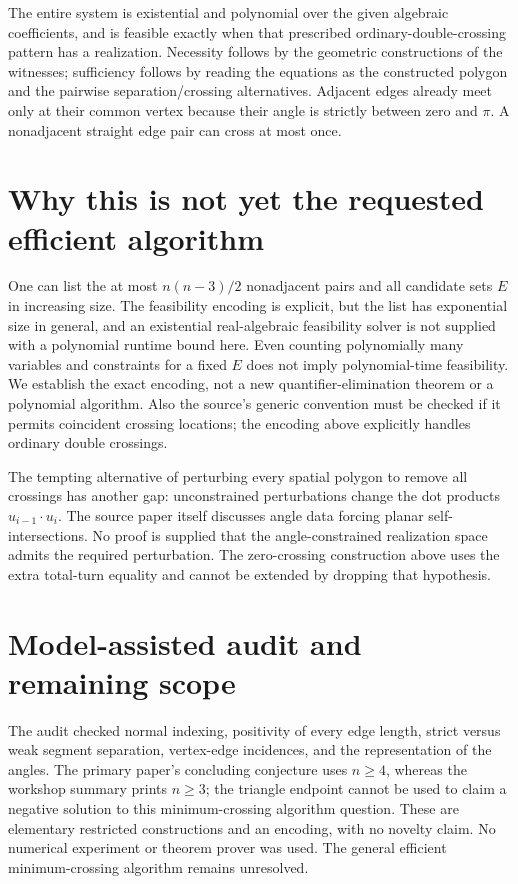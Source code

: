 \documentclass[11pt]{article}
\begin{document}
The entire system is existential and polynomial over the given
algebraic coefficients, and is feasible exactly when that prescribed
ordinary-double-crossing pattern has a realization. Necessity follows
by the geometric constructions of the witnesses; sufficiency follows
by reading the equations as the constructed polygon and the pairwise
separation/crossing alternatives. Adjacent edges already meet only
at their common vertex because their angle is strictly between zero
and $\pi$. A nonadjacent straight edge pair can cross at most once.

\section{Why this is not yet the requested efficient algorithm}
One can list the at most $n(n-3)/2$ nonadjacent pairs and all candidate
sets $E$ in increasing size. The feasibility encoding is explicit,
but the list has exponential size in general, and an existential
real-algebraic feasibility solver is not supplied with a polynomial
runtime bound here. Even counting polynomially many variables and
constraints for a fixed $E$ does not imply polynomial-time feasibility.
We establish the exact encoding, not a new quantifier-elimination
theorem or a polynomial algorithm. Also the source's generic convention
must be checked if it permits coincident crossing locations; the
encoding above explicitly handles ordinary double crossings.

The tempting alternative of perturbing every spatial polygon to remove
all crossings has another gap: unconstrained perturbations change the
dot products $u_{i-1}\cdot u_i$. The source paper itself discusses
angle data forcing planar self-intersections. No proof is supplied
that the angle-constrained realization space admits the required
perturbation. The zero-crossing construction above uses the extra
total-turn equality and cannot be extended by dropping that hypothesis.

\section{Model-assisted audit and remaining scope}
The audit checked normal indexing, positivity of every edge length,
strict versus weak segment separation, vertex-edge incidences, and
the representation of the angles. The primary paper's concluding
conjecture uses $n\ge4$, whereas the workshop summary prints $n\ge3$;
the triangle endpoint cannot be used to claim a negative solution to
this minimum-crossing algorithm question. These are elementary
restricted constructions and an encoding, with no novelty claim.
No numerical experiment or theorem prover was used. The general
efficient minimum-crossing algorithm remains unresolved.
\end{document}
